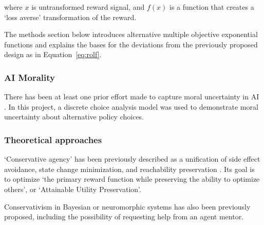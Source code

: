  where $x$ is untransformed reward signal, and $f(x)$ is a function that creates a `loss averse' transformation of the reward.

The methods section below introduces alternative multiple objective exponential functions and explains the bases for the deviations from the previously proposed \cite{rolf_need_2020} design as in Equation~\ref{eq:rolf}.

\subsubsection{AI Morality}

There has been at least one prior effort made to capture moral uncertainty in AI \cite{martinho_empirical_2020}. In this project, a discrete choice analysis model was used to demonstrate moral uncertainty about alternative policy choices.



\subsubsection{Theoretical approaches}


`Conservative agency' has been previously described as a unification of side effect avoidance, state change minimization, and reachability preservation \cite{armstrong_low_2017, turner_conservative_2020}. Its goal is to optimize `the primary reward function while preserving the ability to optimize others', or `Attainable Utility Preservation'.

Conservativism in Bayesian \cite{pmlr-v125-cohen20a} or neuromorphic systems \cite{byrnes_steve_conservatism_2020} has also been previously proposed, including the possibility of requesting help from an agent mentor.


